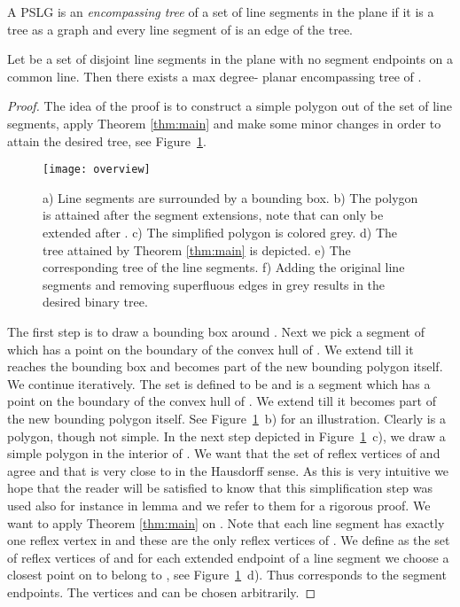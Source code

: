 \documentclass[12pt]{article}
\begin{document}
A PSLG is an \emph{encompassing tree} of a set  of line segments in the plane if it is a tree as a graph and every line segment of  is an edge of the tree.
\begin{theorem}
	Let  be a set of  disjoint line segments in the plane with no  segment endpoints on a common line. Then there exists 
a max degree- planar encompassing tree of . 
\end{theorem}
\begin{proof}
	The idea of the proof is to construct a simple polygon out of the set of line segments, apply Theorem \ref{thm:main} and make some minor changes in order to  attain the desired tree, see Figure~\ref{fig:overview}.
	\begin{figure}[h]
			\begin{center}
			\texttt{[image: overview]}
				\caption{a) Line segments are surrounded by a bounding box. b) The polygon  is attained after the segment extensions, note that  can only be extended after . c) The simplified polygon is colored grey. d) The tree attained by Theorem \ref{thm:main} is depicted. 
				e) The corresponding tree of the line segments.
				 f) Adding the original line segments and removing superfluous edges in grey results in the desired binary tree.}
				\label{fig:overview}
			\end{center}
	\end{figure} 
	The first step is to draw a bounding box  around . Next we pick a segment  of  which has a point on the boundary of the convex hull of . We extend  till it reaches the bounding box and becomes part of the new bounding polygon  itself.
	We continue iteratively. The set  is defined to be  and  is a segment which has a point on the boundary of the convex hull of . We extend  till it becomes part of the new bounding polygon  itself. See Figure~\ref{fig:overview}~b) for an illustration.
Clearly  is a polygon, though not simple. In the next step depicted in Figure~\ref{fig:overview}~c), we draw a simple polygon  in the interior of . We want that the set of reflex vertices of  and  agree and that  is very close to  in the Hausdorff sense. As this is very intuitive we hope that the reader will be satisfied to know that
this simplification step was used also for instance in \cite{2012arXiv1207.2375A} lemma  and we refer to them for a rigorous proof.
We want to apply Theorem \ref{thm:main} on .
Note that each line segment has exactly one reflex vertex in  and these are the only reflex vertices of . We define  as the set of reflex vertices of  and for each extended endpoint of a line segment we choose a closest point on  to belong to , see Figure~\ref{fig:overview}~d). Thus  corresponds to the segment endpoints. The vertices  and  can be chosen arbitrarily.

\end{proof}
\end{document}

